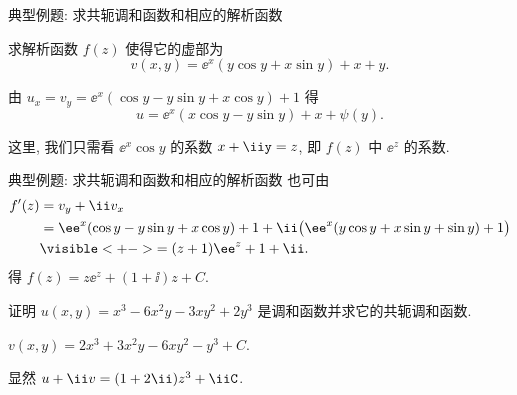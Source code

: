 \begin{frame}{典型例题: 求共轭调和函数和相应的解析函数}
	\beqskip{4pt}
	\onslide<+->
	\begin{example}
		求解析函数 $f(z)$ 使得它的虚部为
	\[
		v(x,y)=\ee^x(y\cos y+x\sin y)+x+y.
	\]
	\end{example}

	\onslide<+->
	\begin{solution}
		由 $u_x=v_y=\ee^x(\cos y-y\sin y+x\cos y)+1$ 得
	\[
			u=\ee^x(x\cos y-y\sin y)+x+\psi(y).
	\]
		\vspace{-\baselineskip}
	\end{solution}
	\onslide<+->
	这里, 我们只需看 $\ee^x\cos y$ 的系数 $x+\iiy=z$, 即 $f(z)$ 中 $\ee^z$ 的系数.
	\endgroup
\end{frame}


\begin{frame}{典型例题: 求共轭调和函数和相应的解析函数}
	\onslide<+->
	也可由
	\begin{align*}
		f'(z)&=v_y+\ii v_x\\
		&=\ee^x(\cos y-y\sin y+x\cos y)+1
		+\ii\bigl(\ee^x(y\cos y+x\sin y+\sin y)+1\bigr)\\
		&\visible<+->{=(z+1)\ee^z+1+\ii.}
	\end{align*}
	\onslide<+->
	得 $f(z)=z\ee^z+(1+\ii)z+C$.
	\onslide<+->
	\begin{exercise}
		证明 $u(x,y)=x^3-6x^2y-3xy^2+2y^3$ 是调和函数并求它的共轭调和函数.
	\end{exercise}

	\onslide<+->
	\begin{answer}
		$v(x,y)=2x^3+3x^2y-6xy^2-y^3+C$.
	\end{answer}
	\onslide<+->
	显然 $u+\ii v=(1+2\ii)z^3+\iiC$.
\end{frame}

